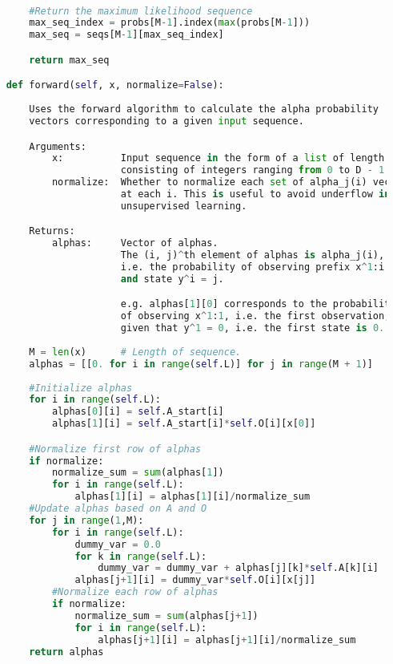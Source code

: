 \begin{lstlisting}[language=Python]
        

        #Return the maximum likelihood sequence
        max_seq_index = probs[M-1].index(max(probs[M-1]))
        max_seq = seqs[M-1][max_seq_index]

        return max_seq

    def forward(self, x, normalize=False):
        
        Uses the forward algorithm to calculate the alpha probability
        vectors corresponding to a given input sequence.

        Arguments:
            x:          Input sequence in the form of a list of length M,
                        consisting of integers ranging from 0 to D - 1.
            normalize:  Whether to normalize each set of alpha_j(i) vectors
                        at each i. This is useful to avoid underflow in
                        unsupervised learning.

        Returns:
            alphas:     Vector of alphas.
                        The (i, j)^th element of alphas is alpha_j(i),
                        i.e. the probability of observing prefix x^1:i
                        and state y^i = j.

                        e.g. alphas[1][0] corresponds to the probability
                        of observing x^1:1, i.e. the first observation,
                        given that y^1 = 0, i.e. the first state is 0.
        
        M = len(x)      # Length of sequence.
        alphas = [[0. for i in range(self.L)] for j in range(M + 1)]
        
        #Initialize alphas
        for i in range(self.L):
            alphas[0][i] = self.A_start[i]
            alphas[1][i] = self.A_start[i]*self.O[i][x[0]]

        #Normalize first row of alphas
        if normalize:
            normalize_sum = sum(alphas[1])
            for i in range(self.L):
                alphas[1][i] = alphas[1][i]/normalize_sum
        #Update alphas based on A and O
        for j in range(1,M):
            for i in range(self.L):
                dummy_var = 0.0
                for k in range(self.L):
                    dummy_var = dummy_var + alphas[j][k]*self.A[k][i]
                alphas[j+1][i] = dummy_var*self.O[i][x[j]]
            #Normalize each row of alphas
            if normalize:
                normalize_sum = sum(alphas[j+1])
                for i in range(self.L):
                    alphas[j+1][i] = alphas[j+1][i]/normalize_sum
        return alphas


\end{lstlisting}
